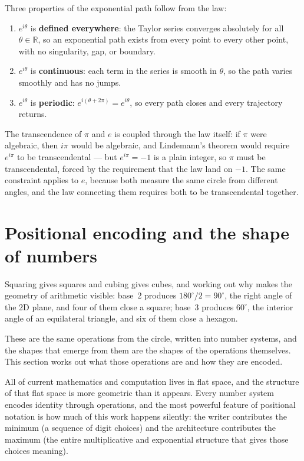 \documentclass[12pt]{article}
\begin{document}
Three properties of the exponential path follow from the law:
\begin{enumerate}
    \item $e^{i\theta}$ is \textbf{defined everywhere}: the Taylor series converges absolutely for all $\theta \in \mathbb{R}$, so an exponential path exists from every point to every other point, with no singularity, gap, or boundary.
    \item $e^{i\theta}$ is \textbf{continuous}: each term in the series is smooth in $\theta$, so the path varies smoothly and has no jumps.
    \item $e^{i\theta}$ is \textbf{periodic}: $e^{i(\theta + 2\pi)} = e^{i\theta}$, so every path closes and every trajectory returns.
\end{enumerate}

The transcendence of $\pi$ and $e$ is coupled through the law itself: if $\pi$ were algebraic, then $i\pi$ would be algebraic, and Lindemann's theorem would require $e^{i\pi}$ to be transcendental --- but $e^{i\pi} = -1$ is a plain integer, so $\pi$ must be transcendental, forced by the requirement that the law land on $-1$. The same constraint applies to $e$, because both measure the same circle from different angles, and the law connecting them requires both to be transcendental together.


\section{Positional encoding and the shape of numbers}

Squaring gives squares and cubing gives cubes, and working out why makes the geometry of arithmetic visible: base~2 produces $180^\circ/2 = 90^\circ$, the right angle of the 2D plane, and four of them close a square; base~3 produces $60^\circ$, the interior angle of an equilateral triangle, and six of them close a hexagon. 

These are the same operations from the circle, written into number systems, and the shapes that emerge from them are the shapes of the operations themselves. This section works out what those operations are and how they are encoded.

All of current mathematics and computation lives in flat space, and the structure of that flat space is more geometric than it appears. Every number system encodes identity through operations, and the most powerful feature of positional notation is how much of this work happens silently: the writer contributes the minimum (a sequence of digit choices) and the architecture contributes the maximum (the entire multiplicative and exponential structure that gives those choices meaning).
\end{document}
